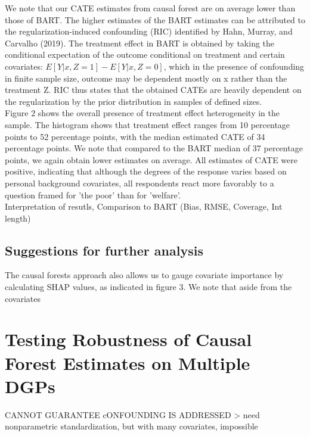 \documentclass[12pt]{article}
\begin{document}
We note that our CATE estimates from causal forest are on average lower than those of BART. The higher estimates of the BART estimates can be attributed to the regularization-induced confounding (RIC) identified by Hahn, Murray, and Carvalho (2019).\cite{CarvalhoHahnMurray} The treatment effect in BART is obtained by taking the conditional expectation of the outcome conditional on treatment and certain covariates: $E[Y|x,Z = 1] - E[Y|x,Z = 0]$, which in the presence of confounding in finite sample size, outcome may be dependent mostly on x rather than the treatment Z. RIC thus states that the obtained CATEs are heavily dependent on the regularization by the prior distribution in samples of defined sizes. \\

Figure 2 shows the overall presence of treatment effect heterogeneity in the sample. The histogram shows that treatment effect ranges from 10 percentage points to 52 percentage points, with the median estimated CATE of 34 percentage points. We note that compared to the BART median of 37 percentage points, we again obtain lower estimates on average. All estimates of CATE were positive, indicating that although the degrees of the response varies based on personal background covariates, all respondents react more favorably to a question framed for 'the poor' than for 'welfare'. \\

Interpretation of resutls, Comparison to BART (Bias, RMSE, Coverage, Int length) \\

\subsection{Suggestions for further analysis}
The causal forests approach also allows us to gauge covariate importance by calculating SHAP values, as indicated in figure 3.  We note that aside from the covariates 










\section{Testing Robustness of Causal Forest Estimates on Multiple DGPs} 

CANNOT GUARANTEE cONFOUNDING IS ADDRESSED > need nonparametric standardization, but with many covariates, impossible 
\end{document}
